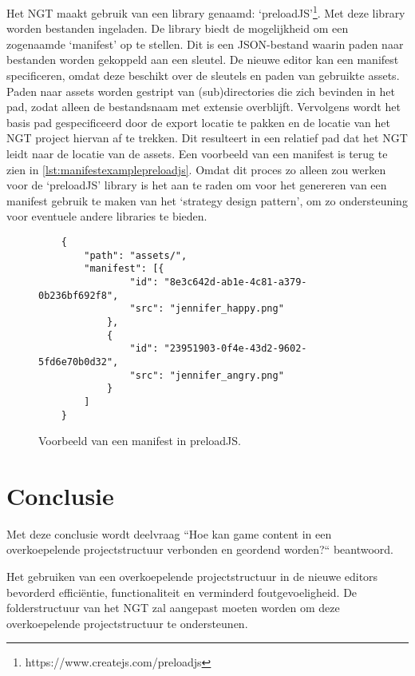 Het NGT maakt gebruik van een library genaamd: ‘preloadJS’\footnote{https://www.createjs.com/preloadjs}. Met deze library worden bestanden ingeladen. De library biedt de mogelijkheid om een zogenaamde ‘manifest’ op te stellen. Dit is een JSON-bestand waarin paden naar bestanden worden gekoppeld aan een sleutel. De nieuwe editor kan een manifest specificeren, omdat deze beschikt over de sleutels en paden van gebruikte assets. Paden naar assets worden gestript van (sub)directories die zich bevinden in het pad, zodat alleen de bestandsnaam met extensie overblijft. Vervolgens wordt het basis pad gespecificeerd door de export locatie te pakken en de locatie van het NGT project hiervan af te trekken. Dit resulteert in een relatief pad dat het NGT leidt naar de locatie van de assets. Een voorbeeld van een manifest is terug te zien in \autoref{lst:manifestexamplepreloadjs}. Omdat dit proces zo alleen zou werken voor de ‘preloadJS’ library is het aan te raden om voor het genereren van een manifest gebruik te maken van het ‘strategy design pattern’, om zo ondersteuning voor eventuele andere libraries te bieden.

\begin{figure}[htb]
    \centering
    \lstset{language=JavaScript}
    \begin{lstlisting}
    {
        "path": "assets/",
        "manifest": [{
                "id": "8e3c642d-ab1e-4c81-a379-0b236bf692f8",
                "src": "jennifer_happy.png"
            },
            {
                "id": "23951903-0f4e-43d2-9602-5fd6e70b0d32",
                "src": "jennifer_angry.png"
            }
        ]
    }               
    \end{lstlisting}
    \caption{Voorbeeld van een manifest in preloadJS.}
    \label{lst:manifestexamplepreloadjs}
\end{figure}

\pagebreak
\section{Conclusie}
Met deze conclusie wordt deelvraag “Hoe kan game content in een overkoepelende projectstructuur verbonden en geordend worden?“ beantwoord.

Het gebruiken van een overkoepelende projectstructuur in de nieuwe editors bevorderd efficiëntie, functionaliteit en verminderd foutgevoeligheid. De folderstructuur van het NGT zal aangepast moeten worden om deze overkoepelende projectstructuur te ondersteunen.

